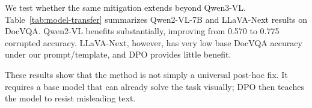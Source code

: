 We test whether the same mitigation extends beyond Qwen3-VL.
Table~\ref{tab:model-transfer} summarizes Qwen2-VL-7B and LLaVA-Next results on DocVQA.
Qwen2-VL benefits substantially, improving from 0.570 to 0.775 corrupted accuracy.
LLaVA-Next, however, has very low base DocVQA accuracy under our prompt/template, and DPO provides little benefit.

\begin{table}[t]
\centering
\caption{Model transfer on DocVQA. DPO helps Qwen2-VL but not LLaVA-Next under our setting.}
\label{tab:model-transfer}
\end{table}

These results show that the method is not simply a universal post-hoc fix.
It requires a base model that can already solve the task visually; DPO then teaches the model to resist misleading text.

